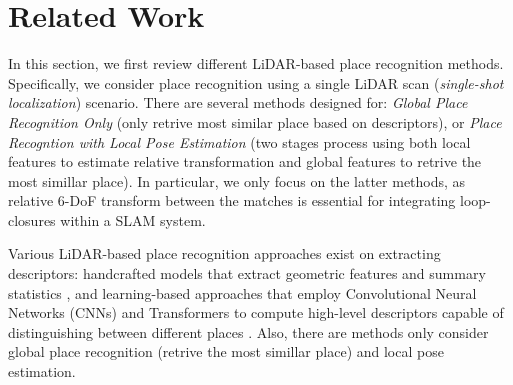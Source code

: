 \chapter{Related Work}
\label{sec:related}



In this section, we first review different LiDAR-based place recognition methods. Specifically, we consider place recognition using a single LiDAR scan (\emph{single-shot localization}) scenario.
There are several methods designed for: \emph{Global Place Recognition Only} (only retrive most similar place based on descriptors), or \emph{Place Recogntion with Local Pose Estimation} (two stages process using both local features to estimate relative transformation and global features to retrive the most simillar place). In particular, we only focus on the latter methods, as relative 6-DoF transform between the matches is essential for integrating loop-closures within a SLAM system.  


Various LiDAR-based place recognition approaches exist on extracting descriptors: handcrafted models that extract geometric features and summary statistics \cite{kim2018iros, yuan2023icra}, and learning-based approaches that employ Convolutional Neural Networks (CNNs) and Transformers to compute high-level descriptors capable of distinguishing between different places \cite{vidanapathirana2022icra, komorowski2022ral}. Also, there are methods only consider global place recognition (retrive the most simillar place) and local pose estimation.
 

